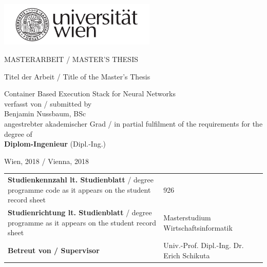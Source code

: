 
\pagestyle{empty}

\clearscrheadings\clearscrplain

\begin{flushright} 
	\includegraphics[width=75mm]{images/logo_uniwien.pdf}\\
\end{flushright}

\begin{center}
\begin{Huge}
MASTERARBEIT / MASTER'S THESIS\\
\vspace{3mm}
\end{Huge}

\vspace{10mm}
{\small Titel der Arbeit / Title of the Master's Thesis}\\
\begin{Large}
Container Based Execution Stack for Neural Networks\\
\vspace{15mm}
{\small verfasst von / submitted by}\\
Benjamin Nussbaum, BSc \\

\vspace{10mm}
{\small angestrebter akademischer Grad / in partial fulfilment of the requirements for the degree of} \\
{\textbf{Diplom-Ingenieur}} (Dipl.-Ing.)\\
\end{Large}
\end{center}

\vspace{8mm}

Wien, 2018 / Vienna, 2018\\[12mm]
\renewcommand{\arraystretch}{1.2}
\begin{tabular}{p{8cm}ll}
{\textbf{Studienkennzahl lt. Studienblatt} / \newline
degree programme code as it appears on \newline the student record sheet} & 926 \\
{\textbf{Studienrichtung lt. Studienblatt} / \newline degree programme as it appears on \newline the student record sheet} & Masterstudium Wirtschaftsinformatik  \\
{\textbf{Betreut von / Supervisor}} & Univ.-Prof. Dipl.-Ing. Dr. Erich Schikuta
\end{tabular}


